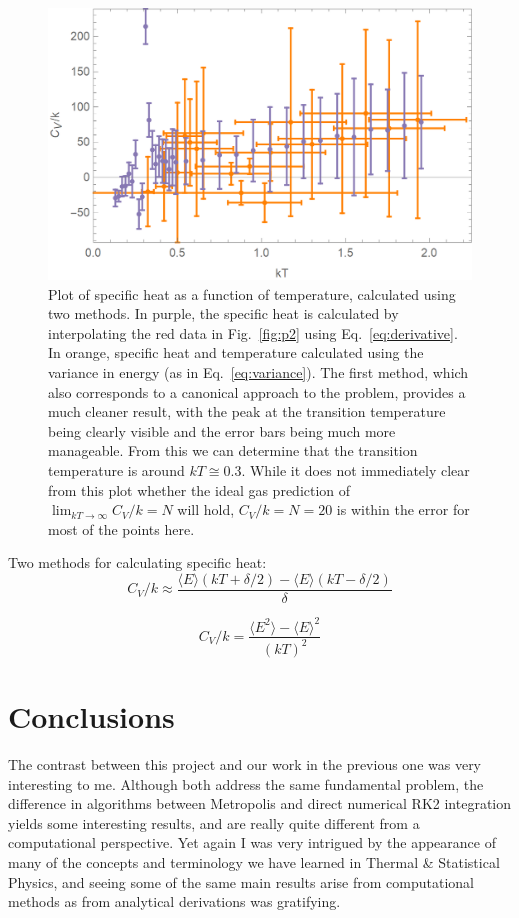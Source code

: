 \documentclass{article}
\begin{document}
\begin{figure}[H]
    \centering
    \includegraphics[width=.7\textwidth]{homework9/p3.png}
    \caption{Plot of specific heat as a function of temperature, calculated using two methods. In purple, the specific heat is calculated by interpolating the red data in Fig.~\ref{fig:p2} using Eq.~\ref{eq:derivative}. In orange, specific heat and temperature calculated using the variance in energy (as in Eq.~\ref{eq:variance}). The first method, which also corresponds to a canonical approach to the problem, provides a much cleaner result, with the peak at the transition temperature being clearly visible and the error bars being much more manageable. From this we can determine that the transition temperature is around $kT\cong0.3$. While it does not immediately clear from this plot whether the ideal gas prediction of $\displaystyle\lim_{kT\to\infty}C_V/k = N$ will hold, $C_V/k=N=20$ is within the error for most of the points here.}
    \label{fig:p3}
\end{figure}

Two methods for calculating specific heat:
\begin{equation}\label{eq:derivative}
    C_V/k \approx \frac{\langle E \rangle (kT+\delta/2)-\langle E \rangle (kT-\delta/2)}{\delta}
\end{equation}

\begin{equation}\label{eq:variance}
    C_V/k = \frac{\langle E^2 \rangle - \langle E\rangle^2}{(kT)^2}
\end{equation}

\section{Conclusions}

The contrast between this project and our work in the previous one was very interesting to me. Although both address the same fundamental problem, the difference in algorithms between Metropolis and direct numerical RK2 integration yields some interesting results, and are really quite different from a computational perspective. Yet again I was very intrigued by the appearance of many of the concepts and terminology we have learned in Thermal \& Statistical Physics, and seeing some of the same main results arise from computational methods as from analytical derivations was gratifying.
\end{document}
